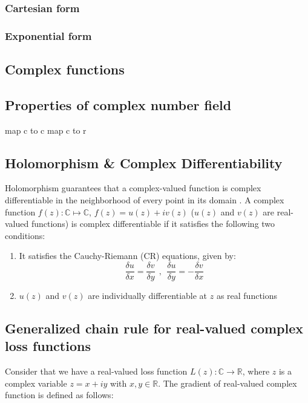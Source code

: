 \subsubsection{Cartesian form}
\subsubsection{Exponential form}
\subsection{Complex functions}
\subsection{Properties of complex number field}
map c to c
map c to r



\subsection{Holomorphism \& Complex Differentiability}

Holomorphism guarantees that a complex-valued function is complex differentiable in the neighborhood of every point in its domain \cite{trabelsi2018deep}.
A complex function $f(z): \mathbb{C} \mapsto \mathbb{C}$, $f(z)= u(z) + iv(z)$ ($u(z)$ and $v(z)$ are real-valued functions) is complex differentiable if it satisfies the following two conditions:
\begin{enumerate}

	\item It satisfies the Cauchy-Riemann (CR) equations, given by:
\begin{equation}\label{eq:compdiff}
\frac{\delta u}{\delta x} = \frac{\delta v}{\delta y} ~~,~~ \frac{\delta u}{\delta y} = - \frac{\delta v}{\delta x} 
\end{equation}
	\item $u(z)$ and $v(z)$ are individually differentiable at $z$ as real functions	
\end{enumerate} 

\subsection{Generalized chain rule for real-valued complex loss  functions}\label{cchainrule}
Consider that we have a real-valued loss function $L(z): \mathbb{C}\rightarrow\mathbb{R}$, where $z$ is a complex variable $z=x+iy$ with $x,y \in \mathbb{R}$. The gradient of real-valued complex function is defined as follows:
 
